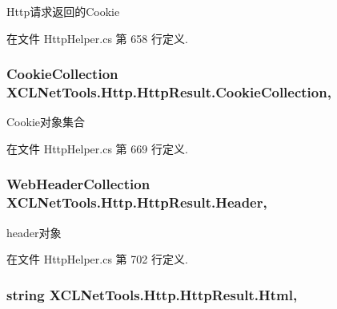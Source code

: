 Http请求返回的\-Cookie 



在文件 Http\-Helper.\-cs 第 658 行定义.

\hypertarget{class_x_c_l_net_tools_1_1_http_1_1_http_result_af9aca82ecce2ed0364caf3343fbba601}{
\subsubsection[{Cookie\-Collection}]{\setlength{\rightskip}{0pt plus 5cm}Cookie\-Collection X\-C\-L\-Net\-Tools.\-Http.\-Http\-Result.\-Cookie\-Collection\hspace{0.3cm}{\ttfamily [get]}, {\ttfamily [set]}}}\label{class_x_c_l_net_tools_1_1_http_1_1_http_result_af9aca82ecce2ed0364caf3343fbba601}


Cookie对象集合 



在文件 Http\-Helper.\-cs 第 669 行定义.

\hypertarget{class_x_c_l_net_tools_1_1_http_1_1_http_result_a332863b39f9b28f275a43048a91754ba}{
\subsubsection[{Header}]{\setlength{\rightskip}{0pt plus 5cm}Web\-Header\-Collection X\-C\-L\-Net\-Tools.\-Http.\-Http\-Result.\-Header\hspace{0.3cm}{\ttfamily [get]}, {\ttfamily [set]}}}\label{class_x_c_l_net_tools_1_1_http_1_1_http_result_a332863b39f9b28f275a43048a91754ba}


header对象 



在文件 Http\-Helper.\-cs 第 702 行定义.

\hypertarget{class_x_c_l_net_tools_1_1_http_1_1_http_result_a5f96bed917f8a3a43b9bc38695f5fb79}{
\subsubsection[{Html}]{\setlength{\rightskip}{0pt plus 5cm}string X\-C\-L\-Net\-Tools.\-Http.\-Http\-Result.\-Html\hspace{0.3cm}{\ttfamily [get]}, {\ttfamily [set]}}}\label{class_x_c_l_net_tools_1_1_http_1_1_http_result_a5f96bed917f8a3a43b9bc38695f5fb79}


